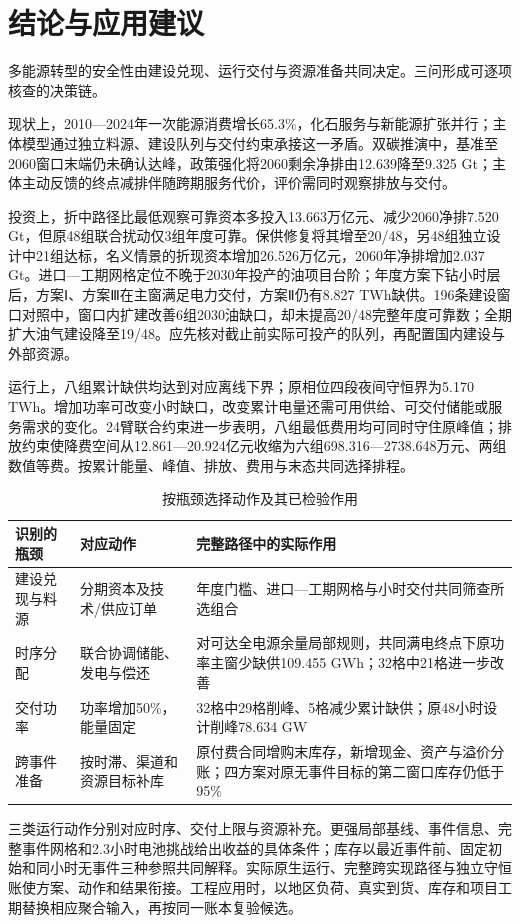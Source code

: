 \section{结论与应用建议}
多能源转型的安全性由建设兑现、运行交付与资源准备共同决定。三问形成可逐项核查的决策链。

现状上，2010—2024年一次能源消费增长65.3\%，化石服务与新能源扩张并行；主体模型通过独立料源、建设队列与交付约束承接这一矛盾。双碳推演中，基准至2060窗口末端仍未确认达峰，政策强化将2060剩余净排由12.639降至9.325 Gt；主体主动反馈的终点减排伴随跨期服务代价，评价需同时观察排放与交付。

投资上，折中路径比最低观察可靠资本多投入13.663万亿元、减少2060净排7.520 Gt，但原48组联合扰动仅3组年度可靠。保供修复将其增至20/48，另48组独立设计中21组达标，名义情景的折现资本增加26.526万亿元，2060年净排增加2.037 Gt。进口—工期网格定位不晚于2030年投产的油项目台阶；年度方案下钻小时层后，方案Ⅰ、方案Ⅲ在主窗满足电力交付，方案Ⅱ仍有8.827 TWh缺供。196条建设窗口对照中，窗口内扩建改善6组2030油缺口，却未提高20/48完整年度可靠数；全期扩大油气建设降至19/48。应先核对截止前实际可投产的队列，再配置国内建设与外部资源。

运行上，八组累计缺供均达到对应离线下界；原相位四段夜间守恒界为5.170 TWh。增加功率可改变小时缺口，改变累计电量还需可用供给、可交付储能或服务需求的变化。24臂联合约束进一步表明，八组最低费用均可同时守住原峰值；排放约束使降费空间从12.861—20.924亿元收缩为六组698.316—2738.648万元、两组数值等费。按累计能量、峰值、排放、费用与末态共同选择排程。

\begin{table}[H]\centering\caption{按瓶颈选择动作及其已检验作用}
\begin{tabularx}{\linewidth}{p{.15\linewidth}p{.23\linewidth}X}\toprule
识别的瓶颈 & 对应动作 & 完整路径中的实际作用\\\midrule
建设兑现与料源 & 分期资本及技术/供应订单 & 年度门槛、进口—工期网格与小时交付共同筛查所选组合\\
时序分配 & 联合协调储能、发电与偿还 & 对可达全电源余量局部规则，共同满电终点下原功率主窗少缺供109.455 GWh；32格中21格进一步改善\\
交付功率 & 功率增加50\%，能量固定 & 32格中29格削峰、5格减少累计缺供；原48小时设计削峰78.634 GW\\
跨事件准备 & 按时滞、渠道和资源目标补库 & 原付费合同增购末库存，新增现金、资产与溢价分账；四方案对原无事件目标的第二窗口库存仍低于95\%\\
\bottomrule\end{tabularx}\end{table}
三类运行动作分别对应时序、交付上限与资源补充。更强局部基线、事件信息、完整事件网格和2.3小时电池挑战给出收益的具体条件；库存以最近事件前、固定初始和同小时无事件三种参照共同解释。实际原生运行、完整跨实现路径与独立守恒账使方案、动作和结果衔接。工程应用时，以地区负荷、真实到货、库存和项目工期替换相应聚合输入，再按同一账本复验候选。

